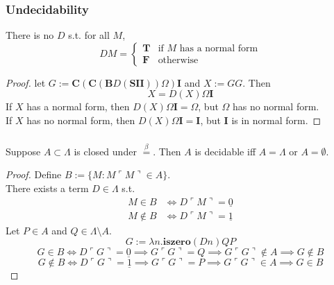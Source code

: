 \documentclass[UTF8,aspectratio=43,11pt,colorlinks,compress,openany]{beamer}%
\begin{document}
\begin{frame}\frametitle{Undecidability}
	\begin{theorem}[Church1936]
		There is no $D$ s.t. for all $M$,
	\setlength\abovedisplayskip{0pt}
	\setlength\belowdisplayskip{0pt}
		\[DM=
		\begin{cases}
		\mathbf{T}&\text{if $M$ has a normal form}\\
		\mathbf{F}&\text{otherwise}
		\end{cases}\]
	\end{theorem}
	\begin{proof}
		let $G:=\mathbf{C}(\mathbf{C}(\mathbf{B}D(\mathbf{S}\mathbf{I}\mathbf{I}))\Omega)\mathbf{I}$ and $X:=GG$. Then
		\[X=D(X)\Omega\mathbf{I}\]
		If $X$ has a normal form, then $D(X)\Omega\mathbf{I}=\Omega$, but $\Omega$ has no normal form.\\
		If $X$ has no normal form, then $D(X)\Omega\mathbf{I}=\mathbf{I}$, but $\mathbf{I}$ is in normal form.
	\end{proof}
\end{frame}

\begin{frame}\frametitle{}
	\begin{theorem}
		Suppose $A\subset\Lambda$ is closed under $\stackrel{\beta}{=}$. Then $A$ is decidable iff $A=\Lambda$ or $A=\emptyset$.
	\end{theorem}
	\begin{proof}
		Define $B:=\{M: M\ulcorner M\urcorner\in A\}$.\\
		There exists a term $D\in\Lambda$ s.t.
		\begin{align*}
		M\in B&\iff D\ulcorner M\urcorner=\underline{0}\\
		M\notin B&\iff D\ulcorner M\urcorner=\underline{1}
		\end{align*}
		Let $P\in A$ and $Q\in\Lambda\setminus A$.
		\[G:=\lambda n.\mathbf{iszero}(Dn)QP\]
		\[G\in B\iff D\ulcorner G\urcorner=\underline{0}\implies G\ulcorner G\urcorner=Q\implies G\ulcorner G\urcorner\notin A\implies G\notin B\]
		\[G\notin B\iff D\ulcorner G\urcorner=\underline{1}\implies G\ulcorner G\urcorner=P\implies G\ulcorner G\urcorner\in A\implies G\in B\]
	\end{proof}
\end{frame}
\end{document}
